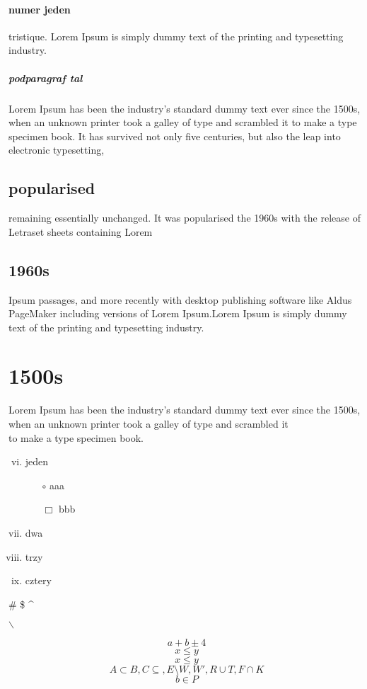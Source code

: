 \documentclass[12pt,legalpaper,fleqn,titlepage,twocolumn]{article}
\begin{document}
\paragraph{numer jeden}
tristique. Lorem Ipsum is simply dummy text of the printing and typesetting industry. 
\subparagraph{podparagraf tal}Lorem Ipsum has been the industry's standard dummy text ever since the 1500s, when an unknown printer took a galley of type and scrambled it to make a type specimen book.
\newline
It has survived not only five centuries, but also the leap into electronic typesetting, \subsection{popularised}
{\Large 
{\color{red}remaining essentially unchanged. It was popularised  
 the 1960s with the release of Letraset sheets containing Lorem}} \subsection{1960s}
Ipsum passages, and more recently with desktop publishing software like Aldus PageMaker including versions of Lorem Ipsum.Lorem Ipsum is simply dummy text of the printing and typesetting industry.
\section{1500s} Lorem Ipsum has been the industry's standard dummy text ever since the 1500s,\linebreak
 when an unknown printer took a galley of type and scrambled it \\
 to make a type specimen book. 
\clearpage
  
  \begin{enumerate}[i.]
  \setcounter{enumi}{5}
 
\item jeden
\begin{itemize}
\item[$\circ$] aaa
\item[$\Box$] bbb
\end{itemize}
\item dwa
\item trzy
\item cztery
\end{enumerate}

\# \$ \^ \* 

$\backslash$

$$a+b\pm 4$$
$$x\leq y$$
$$x \leqslant y$$
$$A\subset B, C \subseteq , E \setminus W, W', R \cup T, F \cap K$$
$$b \in P$$



\tableofcontents
\end{document}
